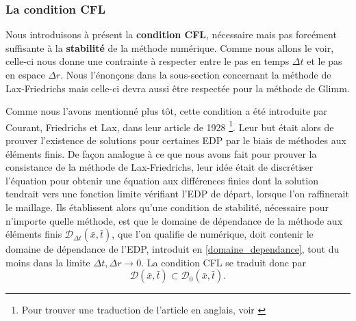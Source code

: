 \documentclass[11pt,a4paper]{article}
\begin{document}
\subsubsection{La condition CFL}

Nous introduisons à présent la \textbf{condition CFL}, nécessaire mais pas forcément suffisante à la \textbf{stabilité} de la méthode numérique. Comme nous allons le voir, celle-ci nous donne une contrainte à respecter entre le pas en temps $\Delta t$ et le pas en espace $\Delta r$. Nous l'énonçons dans la sous-section concernant la méthode de Lax-Friedrichs mais celle-ci devra aussi être respectée pour la méthode de Glimm.

Comme nous l'avons mentionné plus tôt, cette condition a été introduite par Courant, Friedrichs et Lax, dans leur article de 1928 \cite{courant1928partiellen}\footnote{Pour trouver une traduction de l'article en anglais, voir \cite{courant1967partial}}. Leur but était alors de prouver l'existence de solutions pour certaines EDP par le biais de méthodes aux éléments finis. De façon analogue à ce que nous avons fait pour prouver la consistance de la méthode de Lax-Friedrichs, leur idée était de discrétiser l'équation pour obtenir une équation aux différences finies dont la solution tendrait vers une fonction limite vérifiant l'EDP de départ, lorsque l'on raffinerait le maillage.
Ils établissent alors qu'une condition de stabilité, nécessaire pour n'importe quelle méthode, est que le domaine de dépendance de la méthode aux éléments finis $\mathcal{D}_{\Delta t}(\bar{x}, \bar{t})$, que l'on qualifie de numérique, doit contenir le domaine de dépendance de l'EDP, introduit en \ref{domaine_dependance}, tout du moins dans la limite $\Delta t, \Delta r \rightarrow 0$. La condition CFL se traduit donc par
\begin{equation}\label{relation_domaine_dependance}
\mathcal{D}(\bar{x},\bar{t}) \subset\mathcal{D}_0(\bar{x}, \bar{t}).
\end{equation} 
\end{document}
